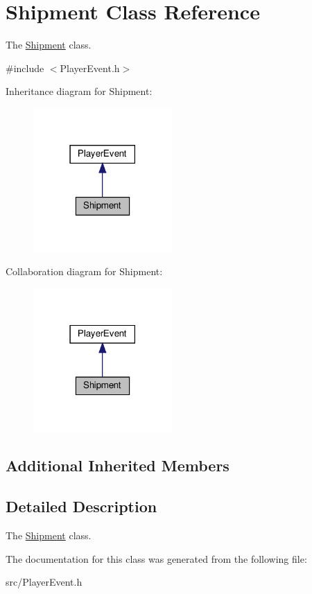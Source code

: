 \hypertarget{classShipment}{}\section{Shipment Class Reference}
\label{classShipment}


The \hyperlink{classShipment}{Shipment} class.  




{\ttfamily \#include $<$Player\+Event.\+h$>$}



Inheritance diagram for Shipment\+:
\nopagebreak
\begin{figure}[H]
\begin{center}
\leavevmode
\includegraphics[width=150pt]{classShipment__inherit__graph}
\end{center}
\end{figure}


Collaboration diagram for Shipment\+:
\nopagebreak
\begin{figure}[H]
\begin{center}
\leavevmode
\includegraphics[width=150pt]{classShipment__coll__graph}
\end{center}
\end{figure}
\subsection*{Additional Inherited Members}


\subsection{Detailed Description}
The \hyperlink{classShipment}{Shipment} class. 

The documentation for this class was generated from the following file\+:\begin{DoxyCompactItemize}
\item 
src/Player\+Event.\+h\end{DoxyCompactItemize}
